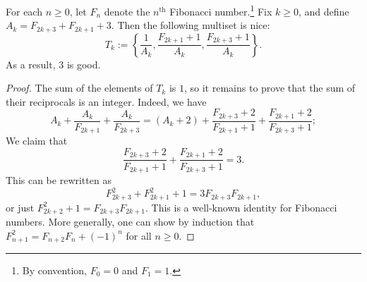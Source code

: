 \begin{claim}
For each $n \geq 0$, let $F_n$ denote the $n^{\text{th}}$ Fibonacci number.\footnote{By convention, $F_0 = 0$ and $F_1 = 1$.}
Fix $k \geq 0$, and define $A_k = F_{2k + 3} + F_{2k + 1} + 3$.
Then the following multiset is nice:
\[ T_k := \left\{\frac{1}{A_k}, \frac{F_{2k + 1} + 1}{A_k}, \frac{F_{2k + 3} + 1}{A_k}\right\}. \]
As a result, $3$ is good.
\end{claim}
\begin{proof}
The sum of the elements of $T_k$ is $1$, so it remains to prove that the sum of their reciprocals is an integer.
Indeed, we have
\[ A_k + \frac{A_k}{F_{2k + 1}} + \frac{A_k}{F_{2k + 3}} = (A_k + 2) + \frac{F_{2k + 3} + 2}{F_{2k + 1} + 1} + \frac{F_{2k + 1} + 2}{F_{2k + 3} + 1}; \]
We claim that
\[ \frac{F_{2k + 3} + 2}{F_{2k + 1} + 1} + \frac{F_{2k + 1} + 2}{F_{2k + 3} + 1} = 3. \]
This can be rewritten as
\[ F_{2k + 3}^2 + F_{2k + 1}^2 + 1 = 3 F_{2k + 3} F_{2k + 1}, \]
    or just $F_{2k + 2}^2 + 1 = F_{2k + 3} F_{2k + 1}$.
This is a well-known identity for Fibonacci numbers.
More generally, one can show by induction that $F_{n + 1}^2 = F_{n + 2} F_n + (-1)^n$ for all $n \geq 0$.
\end{proof}
